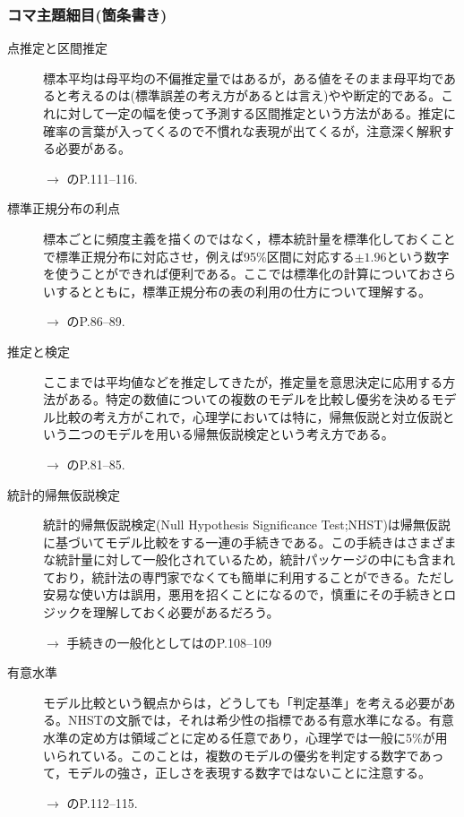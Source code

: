 \subsubsection{コマ主題細目(箇条書き)}
\begin{description}
\item[点推定と区間推定]標本平均は母平均の不偏推定量ではあるが，ある値をそのまま母平均であると考えるのは(標準誤差の考え方があるとは言え)やや断定的である。これに対して一定の幅を使って予測する区間推定という方法がある。推定に確率の言葉が入ってくるので不慣れな表現が出てくるが，注意深く解釈する必要がある。
\begin{flushright}
    $\to$ \citet{川端201408}のP.111--116.
\end{flushright}

\item[標準正規分布の利点]標本ごとに頻度主義を描くのではなく，標本統計量を標準化しておくことで標準正規分布に対応させ，例えば95\%区間に対応する$\pm 1.96$という数字を使うことができれば便利である。ここでは標準化の計算についておさらいするとともに，標準正規分布の表の利用の仕方について理解する。
\begin{flushright}
    $\to$ \citet{Yamada2004}のP.86--89.
\end{flushright}

\item[推定と検定]ここまでは平均値などを推定してきたが，推定量を意思決定に応用する方法がある。特定の数値についての複数のモデルを比較し優劣を決めるモデル比較の考え方がこれで，心理学においては特に，帰無仮説と対立仮説という二つのモデルを用いる帰無仮説検定という考え方である。
\begin{flushright}
    $\to$ \citet{川端201408}のP.81--85.
\end{flushright}

\item[統計的帰無仮説検定]統計的帰無仮説検定(Null Hypothesis Significance Test;NHST)は帰無仮説に基づいてモデル比較をする一連の手続きである。この手続きはさまざまな統計量に対して一般化されているため，統計パッケージの中にも含まれており，統計法の専門家でなくても簡単に利用することができる。ただし安易な使い方は誤用，悪用を招くことになるので，慎重にその手続きとロジックを理解しておく必要があるだろう。
\begin{flushright}
    $\to$ 手続きの一般化としては\citet{Yamada2004}のP.108--109　
\end{flushright}

\item[有意水準]モデル比較という観点からは，どうしても「判定基準」を考える必要がある。NHSTの文脈では，それは希少性の指標である有意水準になる。有意水準の定め方は領域ごとに定める任意であり，心理学では一般に5\%が用いられている。このことは，複数のモデルの優劣を判定する数字であって，モデルの強さ，正しさを表現する数字ではないことに注意する。
\begin{flushright}
    $\to$ \citet{Yamada2004}のP.112--115.
\end{flushright}

\end{description}
